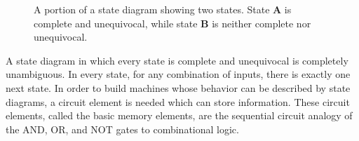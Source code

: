 \begin{figure}[ht]
    \caption{A portion of a state diagram showing two states.
        State \textbf{ A} is complete and unequivocal, while state \textbf{ B} is
    neither complete nor unequivocal.}
    \label{fig:sequentialCirSDproperties}
\end{figure}

A state diagram in which every state is complete and unequivocal
is completely unambiguous.  In every state, for any combination of
inputs, there is exactly one next state.  In order to
build machines whose behavior can be described by state diagrams,
a circuit element is needed which can store information.  These
circuit elements, called the basic memory elements, are the
sequential circuit analogy of the AND, OR, and NOT gates to
combinational logic.

